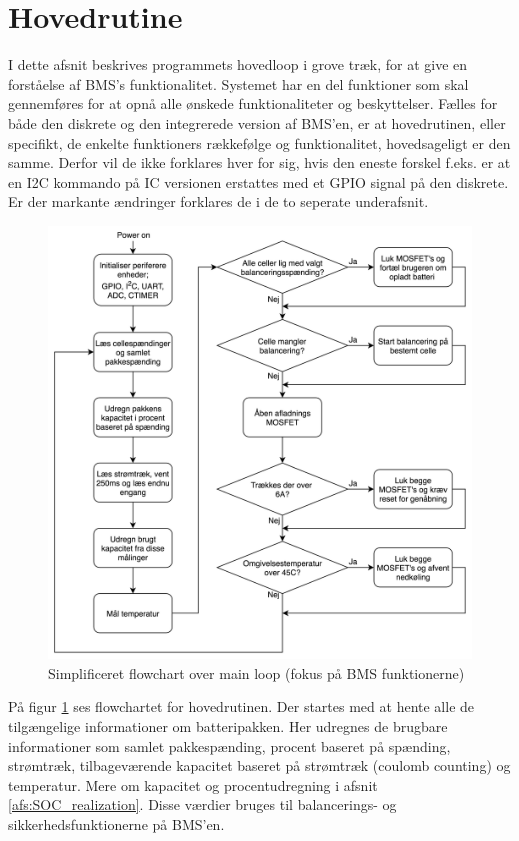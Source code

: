 \section{Hovedrutine}
I dette afsnit beskrives programmets hovedloop i grove træk, for at give en forståelse af BMS's funktionalitet. Systemet har en del funktioner som skal gennemføres for at opnå alle ønskede funktionaliteter og beskyttelser. Fælles for både den diskrete og den integrerede version af BMS'en, er at hovedrutinen, eller specifikt, de enkelte funktioners rækkefølge og funktionalitet, hovedsageligt er den samme. Derfor vil de ikke forklares hver for sig, hvis den eneste forskel f.eks. er at en I2C kommando på IC versionen erstattes med et GPIO signal på den diskrete. Er der markante ændringer forklares de i de to seperate underafsnit. \\

\begin{figure}[h]
	\centering
	\includegraphics[width=15cm]{billeder/main_loop_bms_functions.png}
	\caption{Simplificeret flowchart over main loop (fokus på BMS funktionerne)}
	\label{fig:main_loop}
\end{figure}

På figur \ref{fig:main_loop} ses flowchartet for hovedrutinen. Der startes med at hente alle de tilgængelige informationer om batteripakken. Her udregnes de brugbare informationer som samlet pakkespænding, procent baseret på spænding, strømtræk, tilbageværende kapacitet baseret på strømtræk (coulomb counting) og temperatur. Mere om kapacitet og procentudregning i afsnit \ref{afs:SOC_realization}. Disse værdier bruges til balancerings- og sikkerhedsfunktionerne på BMS'en. \\

